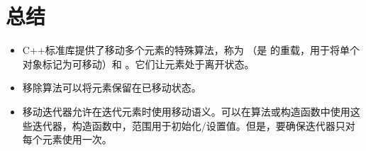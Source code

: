 \section{总结}
\begin{itemize}
	\item C++标准库提供了移动多个元素的特殊算法，称为 （是  的重载，用于将单个对象标记为可移动）和 。它们让元素处于离开状态。
	\item 移除算法可以将元素保留在已移动状态。
	\item 移动迭代器允许在迭代元素时使用移动语义。可以在算法或构造函数中使用这些迭代器，构造函数中，范围用于初始化/设置值。但是，要确保迭代器只对每个元素使用一次。
\end{itemize}


